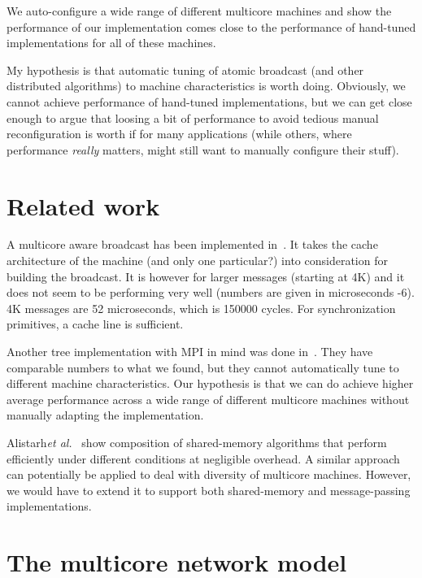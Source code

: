 \documentclass{article}
\newcommand{\etal}{{\it et al.}\xspace}
\begin{document}
We auto-configure a wide range of different multicore machines and
show the performance of our implementation comes close to the
performance of hand-tuned implementations for all of these machines.

My hypothesis is that automatic tuning of atomic broadcast (and other
distributed algorithms) to machine characteristics is worth
doing. Obviously, we cannot achieve performance of hand-tuned
implementations, but we can get close enough to argue that loosing a
bit of performance to avoid tedious manual reconfiguration is worth if
for many applications (while others, where performance \emph{really}
matters, might still want to manually configure their stuff).

\section{Related work}

A multicore aware broadcast has been implemented in~\cite{Tu2008}. It
takes the cache architecture of the machine (and only one particular?)
into consideration for building the broadcast. It is however for
larger messages (starting at 4K) and it does not seem to be performing
very well (numbers are given in microseconds -6). 4K messages are 52
microseconds, which is 150000 cycles. For synchronization primitives,
a cache line is sufficient.

Another tree implementation with MPI in mind was done
in~\cite{Graham2008}. They have comparable numbers to what we found,
but they cannot automatically tune to different machine
characteristics. Our hypothesis is that we can do achieve higher
average performance across a wide range of different multicore
machines without manually adapting the implementation.

Alistarh\etal~\cite{Alistarh2012} show composition of shared-memory
algorithms that perform efficiently under different conditions at
negligible overhead. A similar approach can potentially be applied to
deal with diversity of multicore machines. However, we would have
to extend it to support both shared-memory and message-passing
implementations. 

\section{The multicore network model}
\end{document}
